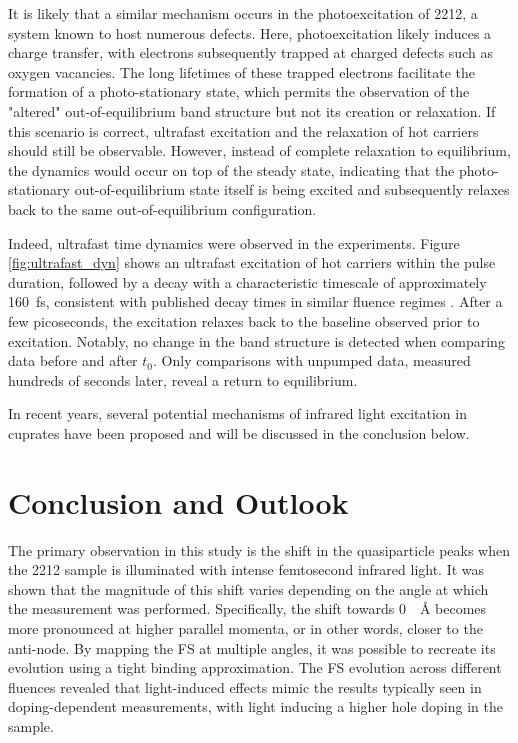 It is likely that a similar mechanism occurs in the photoexcitation of 2212, a system known to host numerous defects.
Here, photoexcitation likely induces a charge transfer, with electrons subsequently trapped at charged defects such as oxygen vacancies.
The long lifetimes of these trapped electrons facilitate the formation of a photo-stationary state, which permits the observation of the "altered" out-of-equilibrium band structure but not its creation or relaxation.
If this scenario is correct, ultrafast excitation and the relaxation of hot carriers should still be observable.
However, instead of complete relaxation to equilibrium, the dynamics would occur on top of the steady state, indicating that the photo-stationary out-of-equilibrium state itself is being excited and subsequently relaxes back to the same out-of-equilibrium configuration.

Indeed, ultrafast time dynamics were observed in the experiments.
Figure \ref{fig:ultrafast_dyn} shows an ultrafast excitation of hot carriers within the pulse duration, followed by a decay with a characteristic timescale of approximately \qty{160}{\femto\second}, consistent with published decay times in similar fluence regimes \cite{dakovski_quasiparticle_2015}.
After a few picoseconds, the excitation relaxes back to the baseline observed prior to excitation.
Notably, no change in the band structure is detected when comparing data before and after $t_0$.
Only comparisons with unpumped data, measured hundreds of seconds later, reveal a return to equilibrium.

In recent years, several potential mechanisms of infrared light excitation in cuprates have been proposed and will be discussed in the conclusion below.

\section{Conclusion and Outlook}

The primary observation in this study is the shift in the quasiparticle peaks when the 2212 sample is illuminated with intense femtosecond infrared light.
It was shown that the magnitude of this shift varies depending on the angle at which the measurement was performed.
Specifically, the shift towards \qty{0}{\per\angstrom} becomes more pronounced at higher parallel momenta, or in other words, closer to the anti-node.
By mapping the FS at multiple angles, it was possible to recreate its evolution using a tight binding approximation.
The FS evolution across different fluences revealed that light-induced effects mimic the results typically seen in doping-dependent measurements, with light inducing a higher hole doping in the sample.

